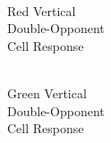 \documentclass[journal,onecolumn]{IEEEtran}
\begin{document}
\begin{figure}[H]
\begin{subfigure}{0.15\textwidth}
        \caption{\\ Red Vertical\\ Double-Opponent\\ Cell Response}
    \end{subfigure}
    \begin{subfigure}{0.15\textwidth}
        \centering
        \captionsetup{justification=centering}
        \caption{\\ Green Vertical\\ Double-Opponent\\ Cell Response}
    \end{subfigure}
    \begin{subfigure}{0.15\textwidth}
        \centering
        \captionsetup{justification=centering}

\end{subfigure}
\end{figure}
\end{document}
